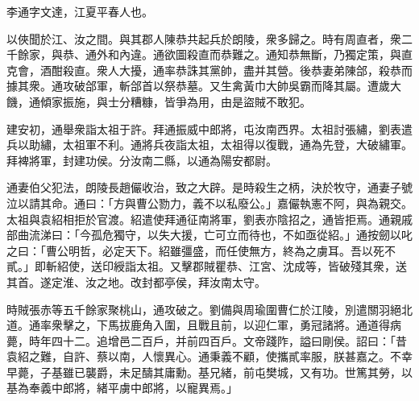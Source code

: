\begin{pinyinscope}
 
 
 李通字文達，江夏平春人也。
 
 
 以俠聞於江、汝之間。與其郡人陳恭共起兵於朗陵，衆多歸之。時有周直者，衆二千餘家，與恭、通外和內違。通欲圖殺直而恭難之。通知恭無斷，乃獨定策，與直克會，酒酣殺直。衆人大擾，通率恭誅其黨帥，盡并其營。後恭妻弟陳郃，殺恭而據其衆。通攻破郃軍，斬郃首以祭恭墓。又生禽黃巾大帥吳霸而降其屬。遭歲大饑，通傾家振施，與士分糟糠，皆爭為用，由是盜賊不敢犯。
 
 
 
 
 建安初，通舉衆詣太祖于許。拜通振威中郎將，屯汝南西界。太祖討張繡，劉表遣兵以助繡，太祖軍不利。通將兵夜詣太祖，太祖得以復戰，通為先登，大破繡軍。拜裨將軍，封建功侯。分汝南二縣，以通為陽安都尉。
 
 
 
 
 通妻伯父犯法，朗陵長趙儼收治，致之大辟。是時殺生之柄，決於牧守，通妻子號泣以請其命。通曰：「方與曹公勠力，義不以私廢公。」嘉儼執憲不阿，與為親交。太祖與袁紹相拒於官渡。紹遣使拜通征南將軍，劉表亦陰招之，通皆拒焉。通親戚部曲流涕曰：「今孤危獨守，以失大援，亡可立而待也，不如亟從紹。」通按劒以叱之曰：「曹公明哲，必定天下。紹雖彊盛，而任使無方，終為之虜耳。吾以死不貳。」即斬紹使，送印綬詣太祖。又擊郡賊瞿恭、江宮、沈成等，皆破殘其衆，送其首。遂定淮、汝之地。改封都亭侯，拜汝南太守。
 
 
時賊張赤等五千餘家聚桃山，通攻破之。劉備與周瑜圍曹仁於江陵，別遣關羽絕北道。通率衆擊之，下馬拔鹿角入圍，且戰且前，以迎仁軍，勇冠諸將。通道得病薨，時年四十二。追增邑二百戶，并前四百戶。文帝踐阼，謚曰剛侯。詔曰：「昔袁紹之難，自許、蔡以南，人懷異心。通秉義不顧，使攜貳率服，朕甚嘉之。不幸早薨，子基雖已襲爵，未足醻其庸勳。基兄緒，前屯樊城，又有功。世篤其勞，以基為奉義中郎將，緒平虜中郎將，以寵異焉。」
 
 
\end{pinyinscope}